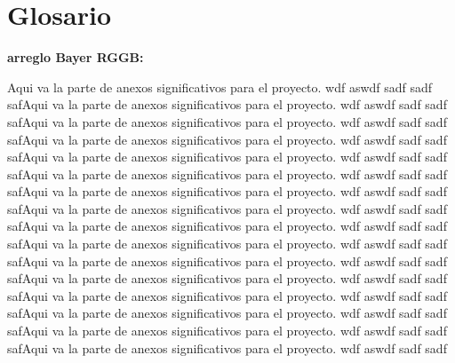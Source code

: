 
\chapter{Glosario} %


\textbf{arreglo Bayer RGGB:} 

Aqui va la parte de anexos significativos para el proyecto. wdf aswdf sadf sadf safAqui va la parte de anexos significativos para el proyecto. wdf aswdf sadf sadf safAqui va la parte de anexos significativos para el proyecto. wdf aswdf sadf sadf safAqui va la parte de anexos significativos para el proyecto. wdf aswdf sadf sadf safAqui va la parte de anexos significativos para el proyecto. wdf aswdf sadf sadf safAqui va la parte de anexos significativos para el proyecto. wdf aswdf sadf sadf safAqui va la parte de anexos significativos para el proyecto. wdf aswdf sadf sadf safAqui va la parte de anexos significativos para el proyecto. wdf aswdf sadf sadf safAqui va la parte de anexos significativos para el proyecto. wdf aswdf sadf sadf safAqui va la parte de anexos significativos para el proyecto. wdf aswdf sadf sadf safAqui va la parte de anexos significativos para el proyecto. wdf aswdf sadf sadf safAqui va la parte de anexos significativos para el proyecto. wdf aswdf sadf sadf safAqui va la parte de anexos significativos para el proyecto. wdf aswdf sadf sadf safAqui va la parte de anexos significativos para el proyecto. wdf aswdf sadf sadf safAqui va la parte de anexos significativos para el proyecto. wdf aswdf sadf sadf safAqui va la parte de anexos significativos para el proyecto. wdf aswdf sadf sadf 